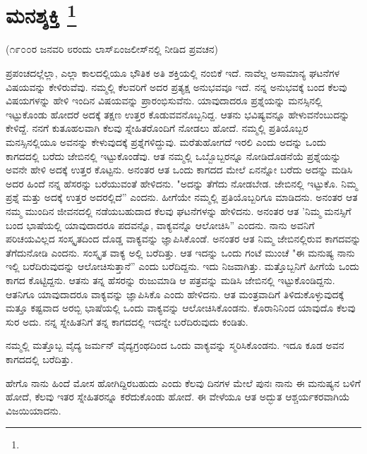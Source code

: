 
\chapter{ಮನಶ್ಶಕ್ತಿ \protect\footnote{}}

\begin{center}
(೧೯೦೦ರ ಜನವರಿ ೮ರಂದು ಲಾಸ್‌ಏಂಜಲೀಸ್‌ನಲ್ಲಿ ನೀಡಿದ ಪ್ರವಚನ)
\end{center}

ಪ್ರಪಂಚದಲ್ಲೆಲ್ಲಾ, ಎಲ್ಲಾ ಕಾಲದಲ್ಲಿಯೂ ಭೌತಿಕ ಅತಿ ಶಕ್ತಿಯಲ್ಲಿ ನಂಬಿಕೆ ಇದೆ. ನಾವೆಲ್ಲ ಅಸಾಮಾನ್ಯ ಘಟನೆಗಳ ವಿಷಯವನ್ನು ಕೇಳಿರುವೆವು. ನಮ್ಮಲ್ಲಿ ಕೆಲವರಿಗೆ ಅದರ ಪ್ರತ್ಯಕ್ಷ ಅನುಭವವೂ ಇದೆ. ನನ್ನ ಅನುಭವಕ್ಕೆ ಬಂದ ಕೆಲವು ವಿಷಯಗಳನ್ನು ಹೇಳಿ ಇಂದಿನ ವಿಷಯವನ್ನು ಪ್ರಾರಂಭಿಸುವೆನು. ಯಾವುದಾದರೂ ಪ್ರಶ್ನೆಯನ್ನು ಮನಸ್ಸಿನಲ್ಲಿ ಇಟ್ಟುಕೊಂಡು ಹೋದರೆ ಅದಕ್ಕೆ ತಕ್ಷಣ ಉತ್ತರ ಕೊಡುವವನೊಬ್ಬನಿದ್ದ. ಆತನು ಭವಿಷ್ಯವನ್ನೂ ಹೇಳುವನೆಂಬುದನ್ನು ಕೇಳಿದ್ದೆ. ನನಗೆ ಕುತೂಹಲವಾಗಿ ಕೆಲವು ಸ್ನೇಹಿತರೊಂದಿಗೆ ನೋಡಲು ಹೋದೆ. ನಮ್ಮಲ್ಲಿ ಪ್ರತಿಯೊಬ್ಬರ ಮನಸ್ಸಿನಲ್ಲಿಯೂ ಅವನನ್ನು ಕೇಳುವುದಕ್ಕೆ ಪ್ರಶ್ನೆಗಳಿದ್ದುವು. ಮರೆತುಹೋಗದೆ ಇರಲಿ ಎಂದು ಅದನ್ನು ಒಂದು ಕಾಗದದಲ್ಲಿ ಬರೆದು ಜೇಬಿನಲ್ಲಿ ಇಟ್ಟುಕೊಂಡೆವು. ಆತ ನಮ್ಮಲ್ಲಿ ಒಬ್ಬೊಬ್ಬರನ್ನೂ ನೋಡಿದೊಡನೆಯೆ ಪ್ರಶ್ನೆಯನ್ನು ಅವನೇ ಹೇಳಿ ಅದಕ್ಕೆ ಉತ್ತರ ಕೊಟ್ಟನು. ಅನಂತರ ಆತ ಒಂದು ಕಾಗದದ ಮೇಲೆ ಏನನ್ನೋ ಬರೆದು ಅದನ್ನು ಮಡಿಸಿ ಅದರ ಹಿಂದೆ ನನ್ನ ಹೆಸರನ್ನು ಬರೆಯುವಂತೆ ಹೇಳಿದನು. "ಅದನ್ನು ತೆಗೆದು ನೋಡಬೇಡ. ಜೇಬಿನಲ್ಲಿ ಇಟ್ಟುಕೊ. ನಿಮ್ಮ ಪ್ರಶ್ನೆ ಮತ್ತು ಅದಕ್ಕೆ ಉತ್ತರ ಅದರಲ್ಲಿದೆ'' ಎಂದನು. ಹೀಗೆಯೇ ನಮ್ಮಲ್ಲಿ ಪ್ರತಿಯೊಬ್ಬರಿಗೂ ಮಾಡಿದನು. ಅನಂತರ ಆತ ನಮ್ಮ ಮುಂದಿನ ಜೀವನದಲ್ಲಿ ನಡೆಯಬಹುದಾದ ಕೆಲವು ಘಟನೆಗಳನ್ನು ಹೇಳಿದನು. ಅನಂತರ ಆತ 'ನಿಮ್ಮ ಮನಸ್ಸಿಗೆ ಬಂದ ಭಾಷೆಯಲ್ಲಿ ಯಾವುದಾದರೂ ಪದವನ್ನೊ, ವಾಕ್ಯವನ್ನೊ ಆಲೋಚಿಸಿ'' ಎಂದನು. ನಾನು ಅವನಿಗೆ ಪರಿಚಯವಿಲ್ಲದ ಸಂಸ್ಕೃತದಿಂದ ದೊಡ್ಡ ವಾಕ್ಯವನ್ನು ಜ್ಞಾಪಿಸಿಕೊಂಡೆ. ಅನಂತರ ಆತ ನಿಮ್ಮ ಜೇಬಿನಲ್ಲಿರುವ ಕಾಗದವನ್ನು ತೆಗೆದುನೋಡಿ ಎಂದನು. ಸಂಸ್ಕೃತ ವಾಕ್ಯ ಅಲ್ಲಿ ಬರೆದಿತ್ತು. ಆತ ಇದನ್ನು ಒಂದು ಗಂಟೆ ಮುಂಚೆ "ಈ ಮನುಷ್ಯ ನಾನು ಇಲ್ಲಿ ಬರೆದಿರುವುದನ್ನು ಆಲೋಚಿಸುತ್ತಾನೆ'' ಎಂದು ಬರೆದಿದ್ದನು. ಇದು ನಿಜವಾಗಿತ್ತು. ಮತ್ತೊಬ್ಬನಿಗೆ ಹೀಗೆಯೆ ಒಂದು ಕಾಗದ ಕೊಟ್ಟಿದ್ದನು. ಆತನು ತನ್ನ ಹೆಸರನ್ನು ರುಜುಮಾಡಿ ಆ ಪತ್ರವನ್ನು ಮಡಿಸಿ ಜೇಬಿನಲ್ಲಿ ಇಟ್ಟುಕೊಂಡಿದ್ದನು. ಆತನಿಗೂ ಯಾವುದಾದರೂ ವಾಕ್ಯವನ್ನು ಜ್ಞಾಪಿಸಿಕೊ ಎಂದು ಹೇಳಿದನು. ಆತ ಮಂತ್ರವಾದಿಗೆ ತಿಳಿದುಕೊಳ್ಳುವುದಕ್ಕೆ ಮತ್ತೂ ಕಷ್ಟವಾದ ಅರಬ್ಬಿ ಭಾಷೆಯಲ್ಲಿ ಒಂದು ವಾಕ್ಯವನ್ನು ಆಲೋಚಿಸಿಕೊಂಡನು. ಕೊರಾನಿನಿಂದ ಯಾವುದೊ ಕೆಲವು ಸುರ ಅದು. ನನ್ನ ಸ್ನೇಹಿತನಿಗೆ ತನ್ನ ಕಾಗದದಲ್ಲಿ ಇದನ್ನೇ ಬರೆದಿರುವುದು ಕಂಡಿತು.

ನಮ್ಮಲ್ಲಿ ಮತ್ತೊಬ್ಬ ವೈದ್ಯ ಜರ್ಮನ್ ವೈದ್ಯಗ್ರಂಥದಿಂದ ಒಂದು ವಾಕ್ಯವನ್ನು ಸ್ಮರಿಸಿಕೊಂಡನು. ಇದೂ ಕೂಡ ಅವನ ಕಾಗದದಲ್ಲಿ ಬರೆದಿತ್ತು.

ಹೇಗೊ ನಾನು ಹಿಂದೆ ಮೋಸ ಹೋಗಿದ್ದಿರಬಹುದು ಎಂದು ಕೆಲವು ದಿನಗಳ ಮೇಲೆ ಪುನಃ ನಾನು ಈ ಮನುಷ್ಯನ ಬಳಿಗೆ ಹೋದೆ, ಕೆಲವು ಇತರ ಸ್ನೇಹಿತರನ್ನೂ ಕರೆದುಕೊಂಡು ಹೋದೆ. ಈ ವೇಳೆಯೂ ಆತ ಅದ್ಭುತ ಆಶ್ಚರ್ಯಕರವಾಗಿಯೆ ವಿಜಯಿಯಾದನು.

